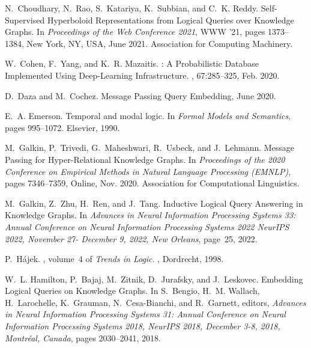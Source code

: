 \documentclass[11pt]{article}
\begin{document}
\begin{thebibliography}{10}
\begin{small}
N.~Choudhary, N.~Rao, S.~Katariya, K.~Subbian, and C.~K. Reddy.
\newblock Self-{{Supervised Hyperboloid Representations}} from {{Logical
  Queries}} over {{Knowledge Graphs}}.
\newblock In {\em Proceedings of the {{Web Conference}} 2021}, {{WWW}} '21,
  pages 1373--1384, {New York, NY, USA}, June 2021. {Association for Computing
  Machinery}.

W.~Cohen, F.~Yang, and K.~R. Mazaitis.
: {{A Probabilistic Database Implemented Using
  Deep-Learning Infrastructure}}.
, 67:285--325, Feb.
  2020.

D.~Daza and M.~Cochez.
\newblock Message {{Passing Query Embedding}}, June 2020.

E.~A. Emerson.
\newblock Temporal and modal logic.
\newblock In {\em Formal Models and Semantics}, pages 995--1072. Elsevier,
  1990.

M.~Galkin, P.~Trivedi, G.~Maheshwari, R.~Usbeck, and J.~Lehmann.
\newblock Message {{Passing}} for {{Hyper-Relational Knowledge Graphs}}.
\newblock In {\em Proceedings of the 2020 {{Conference}} on {{Empirical
  Methods}} in {{Natural Language Processing}} ({{EMNLP}})}, pages 7346--7359,
  {Online}, Nov. 2020. {Association for Computational Linguistics}.

M.~Galkin, Z.~Zhu, H.~Ren, and J.~Tang.
\newblock Inductive {{Logical Query Answering}} in {{Knowledge Graphs}}.
\newblock In {\em Advances in {{Neural Information Processing Systems}} 33:
  {{Annual Conference}} on {{Neural Information Processing Systems}} 2022
  {{NeurIPS}} 2022, {{November}} 27- {{December}} 9, 2022, {{New Orleans}}},
  page~25, 2022.

P.~H{\'a}jek.
, volume~4 of {\em Trends in
  {{Logic}}}.
, {Dordrecht}, 1998.

W.~L. Hamilton, P.~Bajaj, M.~Zitnik, D.~Jurafsky, and J.~Leskovec.
\newblock Embedding {{Logical Queries}} on {{Knowledge Graphs}}.
\newblock In S.~Bengio, H.~M. Wallach, H.~Larochelle, K.~Grauman,
  N.~{Cesa-Bianchi}, and R.~Garnett, editors, {\em Advances in {{Neural
  Information Processing Systems}} 31: {{Annual Conference}} on {{Neural
  Information Processing Systems}} 2018, {{NeurIPS}} 2018, {{December}} 3-8,
  2018, {{Montr\'eal}}, {{Canada}}}, pages 2030--2041, 2018.


\end{small}
\end{thebibliography}
\end{document}
